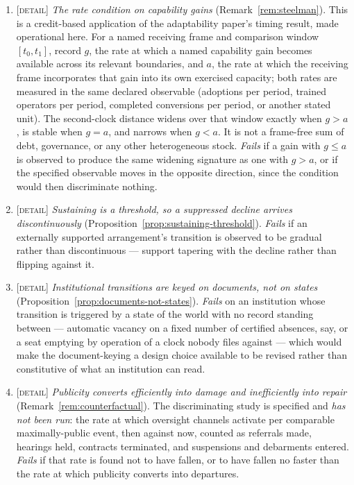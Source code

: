 \documentclass[11pt,a4paper]{article}
\theoremstyle{remark}
\begin{document}
\begin{enumerate}[leftmargin=2em]
\item \textsc{[detail]} \emph{The rate condition on capability gains} (Remark~\ref{rem:steelman}).
This is a credit-based application of the adaptability paper's timing result, made operational here. For
a named receiving frame and comparison window $[t_0,t_1]$, record $g$, the rate at which a named
capability gain becomes available across its relevant boundaries, and $a$, the rate at which the
receiving frame incorporates that gain into its own exercised capacity; both rates are measured in the
same declared observable (adoptions per period, trained operators per period, completed conversions per
period, or another stated unit). The second-clock distance widens over that window exactly when
$g>a$, is stable when $g=a$, and narrows when $g<a$. It is not a frame-free sum of debt, governance,
or any other heterogeneous stock. \emph{Fails} if a gain with $g\leq a$ is observed to produce the
same widening signature as one with $g>a$, or if the specified observable moves in the opposite
direction, since the condition would then discriminate nothing.

\item \textsc{[detail]} \emph{Sustaining is a threshold, so a suppressed decline arrives
discontinuously} (Proposition~\ref{prop:sustaining-threshold}). \emph{Fails} if an externally supported
arrangement's transition is observed to be gradual rather than discontinuous --- support tapering with
the decline rather than flipping against it.

\item \textsc{[detail]} \emph{Institutional transitions are keyed on documents, not on states}
(Proposition~\ref{prop:documents-not-states}). \emph{Fails} on an institution whose transition is
triggered by a state of the world with no record standing between --- automatic vacancy on a fixed number
of certified absences, say, or a seat emptying by operation of a clock nobody files against --- which
would make the document-keying a design choice available to be revised rather than constitutive of what
an institution can read.

\item \textsc{[detail]} \emph{Publicity converts efficiently into damage and inefficiently into repair}
(Remark~\ref{rem:counterfactual}). The discriminating study is specified and \emph{has not been run}: the
rate at which oversight channels activate per comparable maximally-public event, then against now,
counted as referrals made, hearings held, contracts terminated, and suspensions and debarments entered.
\emph{Fails} if that rate is found not to have fallen, or to have fallen no faster than the rate at which
publicity converts into departures.


\end{enumerate}
\end{document}
